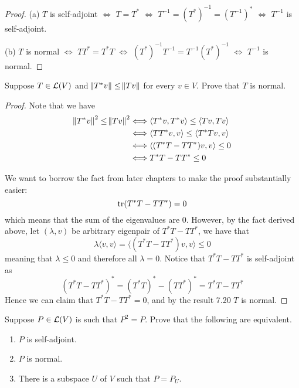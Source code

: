 \documentclass{extarticle}
\begin{document}
\begin{proof}
(a) \(T\) is self-adjoint \(\Longleftrightarrow\) \(T = T^*\) \(\Longleftrightarrow\) \(T^{-1} = (T^*)^{-1} = (T^{-1})^*\)
\(\Longleftrightarrow\) \(T^{-1}\) is self-adjoint. 

(b) \(T\) is normal \(\Longleftrightarrow\) \(TT^* = T^*T\) \(\Longleftrightarrow\)
\((T^*)^{-1}T^{-1} = T^{-1}(T^*)^{-1}\) \(\Longleftrightarrow\) \(T^{-1}\) is normal.
\end{proof}




\begin{problem}{19}
    Suppose \(T \in \mathcal{L}(V)\) and \(\norm{T^* v} \leq \norm{Tv}\) for every \(v \in V\). Prove that 
    \(T\) is normal.
\end{problem}

\begin{proof}

Note that we have 
\begin{align*}
    \norm{T^* v}^2 \leq \norm{T v}^2
    &\Longleftrightarrow \langle T^*v,T^* v \rangle \leq \langle Tv,Tv \rangle \\ 
    &\Longleftrightarrow \langle TT^*v,v \rangle \leq \langle T^* Tv,v \rangle \\ 
    &\Longleftrightarrow \langle (T^*T - TT^*)v,v \rangle \leq 0 \\ 
    &\Longleftrightarrow T^* T - TT^* \leq 0
\end{align*}

We want to borrow the fact from later chapters to make the proof substantially easier: 
\[\text{tr}(T^* T - TT^*) = 0 \]
which means that the sum of the eigenvalues are 0. However, by the fact derived above, let 
\((\lambda, v)\) be arbitrary eigenpair of \(T^* T - TT^*\), we have that 
\[\lambda \langle v,v \rangle = \langle (T^* T - TT^* )v,v \rangle \leq 0\]
meaning that \(\lambda \leq 0\) and therefore all \(\lambda = 0\). Notice that 
\(T^*T - TT^*\) is self-adjoint as 
\[(T^*T - TT^*)^* = (T^* T)^* - (TT^*)^* = T^* T - TT^*\]
Hence we can claim that \(T^* T - TT^* = 0\), and by the result 7.20 \(T\) is normal.
\end{proof}



\begin{problem}{20}
    Suppose \(P \in \mathcal{L}(V)\) is such that \(P^2 = P\). Prove that the following are equivalent. 
    \begin{enumerate}[label=(\alph*)]
        \item \(P\) is self-adjoint. 
        \item \(P\) is normal. 
        \item There is a subspace \(U\) of \(V\) such that \(P = P_U\). 
    \end{enumerate}
\end{problem}
\end{document}
